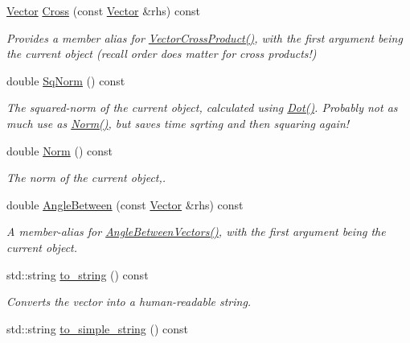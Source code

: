 \begin{DoxyCompactItemize}
\hyperlink{classJSL_1_1Vector}{Vector} \hyperlink{classJSL_1_1Vector_a59ff98a99ebcf2b589290b9e57b8e184}{Cross} (const \hyperlink{classJSL_1_1Vector}{Vector} \&rhs) const
\begin{DoxyCompactList}\small\item\em Provides a member alias for \hyperlink{namespaceJSL_aa7816eb0cd81b74241ce460237990e70}{Vector\+Cross\+Product()}, with the first argument being the current object (recall order does matter for cross products!) \end{DoxyCompactList}\item 
double \hyperlink{classJSL_1_1Vector_ac1346e26bc981bf45d2c1c4317dac4e6}{Sq\+Norm} () const
\begin{DoxyCompactList}\small\item\em The squared-\/norm of the current object, calculated using \hyperlink{classJSL_1_1Vector_a60660b5a26e0ddace46f31699834b671}{Dot()}. Probably not as much use as \hyperlink{classJSL_1_1Vector_aa8af717591f5548ff471b6e4b28d7f9c}{Norm()}, but saves time sqrting and then squaring again! \end{DoxyCompactList}\item 
double \hyperlink{classJSL_1_1Vector_aa8af717591f5548ff471b6e4b28d7f9c}{Norm} () const
\begin{DoxyCompactList}\small\item\em The norm of the current object,. \end{DoxyCompactList}\item 
double \hyperlink{classJSL_1_1Vector_a0529640bc02ce994026184d93f43f9c3}{Angle\+Between} (const \hyperlink{classJSL_1_1Vector}{Vector} \&rhs) const
\begin{DoxyCompactList}\small\item\em A member-\/alias for \hyperlink{namespaceJSL_a09355c91f84fd99d4634bf9189fef51d}{Angle\+Between\+Vectors()}, with the first argument being the current object. \end{DoxyCompactList}\item 
std\+::string \hyperlink{classJSL_1_1Vector_a73579b4a194cc924341806a5d9ea3817}{to\+\_\+string} () const
\begin{DoxyCompactList}\small\item\em Converts the vector into a human-\/readable string. \end{DoxyCompactList}\item 
std\+::string \hyperlink{classJSL_1_1Vector_ad2d0bfdb432809a88a49f4576b0afb5a}{to\+\_\+simple\+\_\+string} () const
\item 

\end{DoxyCompactItemize}

